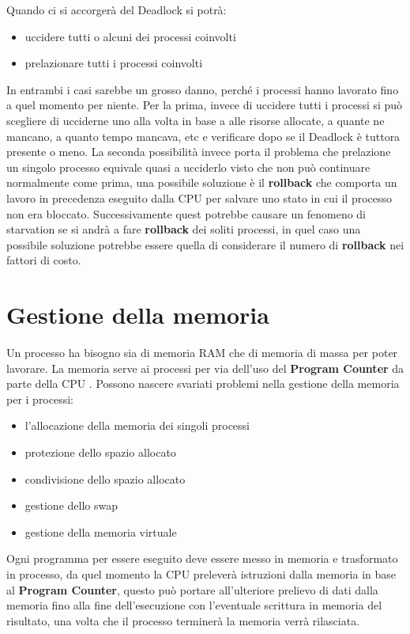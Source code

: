 \documentclass[a4paper, 12pt]{book}
\begin{document}
 Quando ci si accorgerà del Deadlock si potrà:
 \begin{itemize}
     \item uccidere tutti o alcuni dei processi coinvolti
     \item prelazionare tutti i processi coinvolti
 \end{itemize}
 In entrambi i casi sarebbe un grosso danno, perché i processi hanno lavorato fino a quel momento  
 per niente.
 Per la prima, invece di uccidere tutti i processi si può scegliere di ucciderne uno alla volta in base a 
 alle risorse allocate, a quante ne mancano, a quanto tempo mancava, etc e verificare dopo se il Deadlock 
 è tuttora presente o meno.
 La seconda possibilità invece porta il problema che prelazione un singolo processo equivale quasi a ucciderlo 
 visto che non può continuare normalmente come prima, una possibile soluzione è il \textbf{rollback} che comporta
 un lavoro in precedenza eseguito dalla CPU per salvare uno stato in cui il processo non era bloccato.
 Successivamente quest potrebbe causare un fenomeno di starvation se si andrà a fare \textbf{rollback} dei soliti
 processi, in quel caso una possibile soluzione potrebbe essere quella di considerare il numero di \textbf{rollback}
 nei fattori di costo.

 \chapter{Gestione della memoria}

 Un processo ha bisogno sia di memoria RAM che di memoria di massa per poter lavorare. La memoria serve ai processi per
 via dell'uso del \textbf{Program Counter} da parte della CPU .
 Possono nascere svariati problemi nella gestione della memoria per i processi:
 \begin{itemize}
     \item l'allocazione della memoria dei singoli processi
     \item protezione dello spazio allocato
     \item condivisione dello spazio allocato
     \item gestione dello swap
     \item gestione della memoria virtuale
 \end{itemize}
 Ogni programma per essere eseguito deve essere messo in memoria e trasformato in processo, da quel momento la CPU
 preleverà istruzioni dalla memoria in base al \textbf{Program Counter}, questo può portare all'ulteriore prelievo di dati dalla
 memoria fino alla fine dell'esecuzione con l'eventuale scrittura in memoria del risultato, una volta che il processo terminerà
 la memoria verrà rilasciata.
\end{document}
